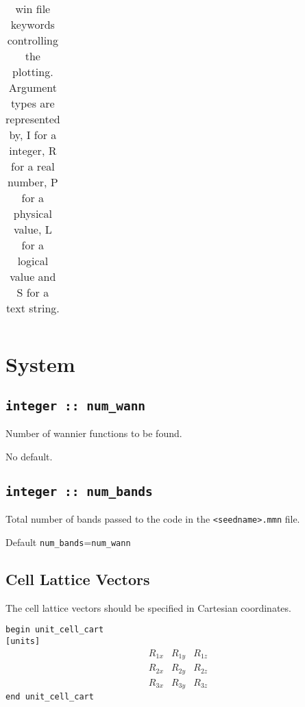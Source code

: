 \begin{table}
\begin{center}
\begin{tabular}{|c|c|p{6cm}|}
\hline
\end{tabular}
\caption[Parameter file keywords controlling plotting.]
{win file keywords controlling the  plotting.  Argument types
are represented by, I for a integer, R for a real number, P for a
physical value, L for a logical value and S for a text string.}
\label{parameter_keywords6}
\end{center}
\end{table}

\clearpage


\section{System}

\subsection[num\_wann]{\tt integer :: num\_wann}
Number of wannier functions to be found.

No default.

\subsection[num\_bands]{\tt integer :: num\_bands} 

Total number of bands passed to the code in the {\tt <seedname>.mmn} file.

Default \verb#num_bands#=\verb#num_wann#

\subsection[Cell Lattice Vectors]{Cell Lattice Vectors}

The cell lattice vectors should be specified in Cartesian coordinates.


\noindent \verb#begin unit_cell_cart# \\
\verb#[units]#
$$
\begin{array}{ccc}
R_{1x} & R_{1y} & R_{1z} \\
R_{2x} & R_{2y} & R_{2z} \\
R_{3x} & R_{3y} & R_{3z}
\end{array}
$$
\verb#end unit_cell_cart#

